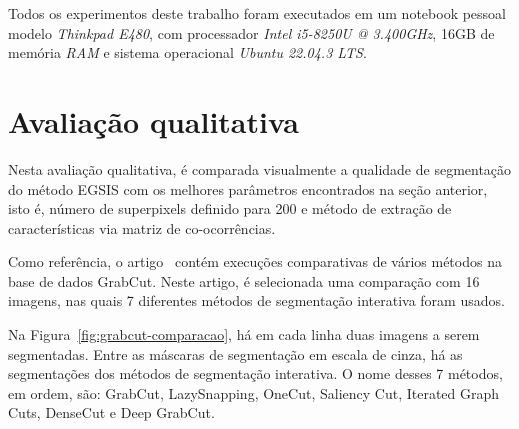 Todos os experimentos deste trabalho foram executados em um notebook
pessoal modelo \textit{Thinkpad E480}, com processador \textit{Intel i5-8250U @
3.400GHz}, 16GB de memória \textit{RAM} e sistema operacional \textit{Ubuntu 22.04.3
LTS}.


\section{Avaliação qualitativa}

Nesta avaliação qualitativa, é comparada visualmente a qualidade
de segmentação do método \gls{EGSIS} com os melhores parâmetros
encontrados na seção anterior, isto é, número de superpixels definido
para 200 e método de extração de características via matriz de
co-ocorrências.

Como referência, o artigo~\cite{wang2023review} contém execuções
comparativas de vários métodos na base de dados GrabCut. Neste artigo,
é selecionada uma comparação com 16 imagens, nas quais 7 diferentes
métodos de segmentação interativa foram usados.

\begin{figure}[h!]
        \captionsetup{width=16cm}
		\centering
\end{figure}
\FloatBarrier{}

Na Figura~\ref{fig:grabcut-comparacao}, há em cada linha duas
imagens a serem segmentadas. Entre as máscaras de segmentação em escala
de cinza, há as segmentações dos métodos de segmentação
interativa. O nome desses 7 métodos, em ordem, são: GrabCut,
LazySnapping, OneCut, Saliency Cut, Iterated Graph Cuts\footnotemark{}, DenseCut e
Deep GrabCut.


